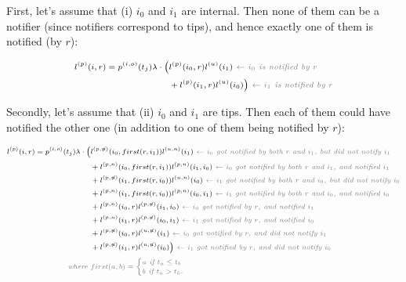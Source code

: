 \documentclass[a4paper,10pt]{article}
\begin{document}
First, let's assume that (i) $i_0$ and $i_1$ are internal. Then none of them can be a notifier (since notifiers correspond to tips), and hence exactly one of them is notified (by $r$):

\begin{equation}
\scriptsize
\begin{split}
l^{(p)}(i, r) = p^{(i,o)}(t_j) \lambda \cdot
\Big(&l^{(p)}(i_0,r)l^{(u)}(i_1) \textit{\color{gray}~$\leftarrow$ $i_0$ is notified by $r$} \\
& + l^{(p)}(i_1,r)l^{(u)}(i_0)\Big) \textit{\color{gray}~$\leftarrow$ $i_1$ is notified by $r$} \\
 \end{split}
\label{eq:lp-int-int}
\end{equation}

Secondly, let's assume that (ii) $i_0$ and $i_1$ are tips. Then each of them could have notified the other one (in addition to one of them being notified by $r$):

 
\begin{equation}
\scriptsize
\begin{split}
l^{(p)}(i, r) = p^{(i,o)}(t_j) \lambda \cdot
\Big(&l^{(p,\not{n})}(i_0,first(r,i_1))l^{(u,n)}(i_1) \textit{\color{gray}~$\leftarrow$ $i_0$ got notified by both $r$ and $i_1$, but did not notify $i_1$} \\
&+ l^{(p,n)}(i_0,first(r,i_1))l^{(p,n)}(i_1, i_0) \textit{\color{gray}~$\leftarrow$ $i_0$ got notified by both $r$ and $i_1$, and notified $i_1$} \\
&+l^{(p,\not{n})}(i_1,first(r,i_0))l^{(u,n)}(i_0) \textit{\color{gray}~$\leftarrow$ $i_1$ got notified by both $r$ and $i_0$, but did not notify $i_0$} \\
&+ l^{(p,n)}(i_1,first(r,i_0))l^{(p,n)}(i_0, i_1) \textit{\color{gray}~$\leftarrow$ $i_1$ got notified by both $r$ and $i_0$, and notified $i_0$} \\
&+l^{(p,n)}(i_0,r)l^{(p,\not{n})}(i_1, i_0) \textit{\color{gray}~$\leftarrow$ $i_0$ got notified by $r$, and notified $i_1$} \\
& + l^{(p,n)}(i_1,r)l^{(p,\not{n})}(i_0, i_1) \textit{\color{gray}~$\leftarrow$ $i_1$ got notified by $r$, and notified $i_0$} \\
&+l^{(p,\not{n})}(i_0,r)l^{(u,\not{n})}(i_1) \textit{\color{gray}~$\leftarrow$ $i_0$ got notified by $r$, and did not notify $i_1$} \\
& + l^{(p,\not{n})}(i_1,r)l^{(u,\not{n})}(i_0)\Big) \textit{\color{gray}~$\leftarrow$ $i_1$ got notified by $r$, and did not notify $i_0$} \\
\textit{\color{gray}~where } &\color{gray}first(a,b) = 
\begin{cases}
a \textit{~if $t_a \leq t_b$}\\
b \textit{~if $t_a > t_b$.}
\end{cases} 
 \end{split}
\label{eq:lu-tip-tip}
\end{equation}
\end{document}
